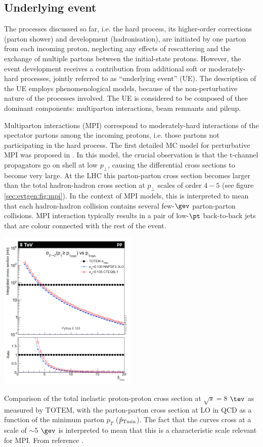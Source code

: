 \subsection{Underlying event}

The processes discussed so far, i.e. the hard process, its higher-order corrections (parton shower) and development (hadronisation), are initiated by one parton from each incoming proton, neglecting  any effects of rescattering and the exchange of multiple partons between the initial-state protons. However, the event development receives a contribution from additional soft or moderately-hard processes, jointly referred to as ``underlying event'' (UE). The description of the UE employs phenomenological models, because of the non-perturbative nature of the processes involved. The  UE is considered to be composed of thee dominant components: multiparton interactions, beam remnants and pileup.\par
Multiparton interactions (MPI) correspond to moderately-hard interactions of the spectator partons among the incoming protons, i.e. those partons not participating in the hard process. The first detailed MC model for perturbative MPI was proposed in \cite{Sjostrand:1987su}. In this model, the crucial observation is that the t-channel propagators go on shell at low $p_{\bot}$, causing the differential cross sections to become very large. At the LHC  this parton-parton cross section becomes larger than the total hadron-hadron cross section at $p_{\bot}$ scales of order $4-5$ \gev (see figure \ref{sec:evtgen:fig:mpi}). In the context of MPI models, this is interpreted to mean that each hadron-hadron collision contains several few-$\gev$ parton-parton collisions. MPI interaction typically results in a pair of low-$\pt$ back-to-back jets that are colour connected with the rest of the event.

\bfig[h!]
\centering
\includegraphics[width=0.5\textwidth]{figures/EvtGen/mpi.png}
\captionsetup{width=0.85\textwidth} \caption{\small Comparison of the total inelastic proton-proton cross section at $\sqrt{s}=8$ $\tev$ as measured by TOTEM, with the parton-parton cross section at LO in QCD as a function of the minimum parton $p_T$ ($\hat{p}_{{\rm T}{\rm min}}$). The fact that the curves cross at a scale of $\sim5$ $\gev$ is interpreted to mean that this is a characteristic scale relevant for MPI. From reference \cite{Skands:2012ts}.}
\label{sec:evtgen:fig:mpi}
\efig

